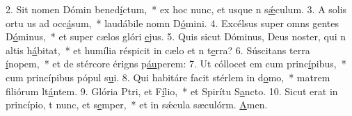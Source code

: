 2. Sit nomen Dómin bened\uline{í}ctum,~* ex hoc nunc, et usque n s\uline{ǽ}culum.
3. A solis ortu us ad occ\uline{á}sum,~* laudábile nomn D\uline{ó}mini.
4. Excélsus super omns gentes D\uline{ó}minus,~* et super cælos glóri \uline{e}jus.
5. Quis sicut Dóminus, Deus noster, qui n altis h\uline{á}bitat,~* et humília réspicit in cælo et n t\uline{e}rra?
6. Súscitans  terra \uline{í}nopem,~* et de stércore érigns p\uline{áu}perem:
7. Ut cóllocet em cum princ\uline{í}pibus,~* cum princípibus pópul s\uline{u}i.
8. Qui habitáre facit stérlem in d\uline{o}mo,~* matrem filiórum lt\uline{á}ntem.
9. Glória Ptri, et F\uline{í}lio,~* et Spirítu S\uline{a}ncto.
10. Sicut erat in princípio, t nunc, et s\uline{e}mper,~* et in sǽcula sæculórm. \uline{A}men.
